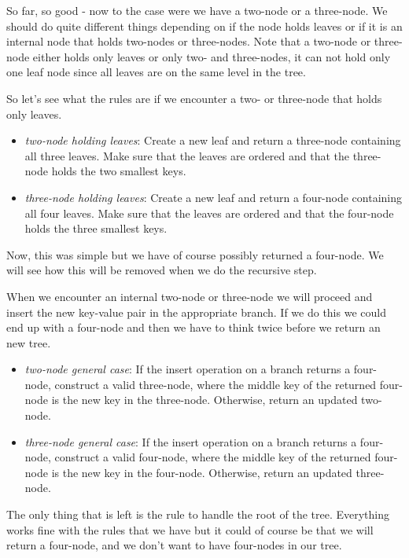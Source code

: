 \documentclass[a4paper,11pt]{article}
\begin{document}
So far, so good - now to the case were we have a two-node or a
three-node. We should do quite different things depending on if the
node holds leaves or if it is an internal node that holds two-nodes or
three-nodes. Note that a two-node or three-node either holds only
leaves or only two- and three-nodes, it can not hold only one leaf node
since all leaves are on the same level in the tree.

So let's see what the rules are if we encounter a two- or three-node
that holds only leaves.

\begin{itemize}
    \item {\em two-node holding leaves}: Create a new leaf and return a
    three-node containing all three leaves. Make sure that the leaves
    are ordered and that the three-node holds the two smallest keys.
    \item {\em three-node holding leaves}: Create a new leaf and return a
    four-node containing all four leaves. Make sure that the leaves
    are ordered and that the four-node holds the three smallest keys.     
\end{itemize}

Now, this was simple but we have of course possibly returned a
four-node. We will see how this will be removed when we do the
recursive step.

When we encounter an internal two-node or three-node we will proceed and
insert the new key-value pair in the appropriate branch. If we do this we
could end up with a four-node and then we have to think twice before
we return an new tree.

\begin{itemize}
    \item {\em two-node general case}: If the insert operation on a branch returns a four-node, construct a valid three-node, where the middle key of the returned four-node is the new key in the three-node. Otherwise, return an updated two-node.
    \item {\em three-node general case}: If the insert operation on a branch returns a four-node, construct a valid four-node, where the middle key of the returned four-node is the new key in the four-node. Otherwise, return an updated three-node.
\end{itemize}

The only thing that is left is the rule to handle the root of the
tree. Everything works fine with the rules that we have but it could
of course be that we will return a four-node, and we don't want to have
four-nodes in our tree.
\end{document}
